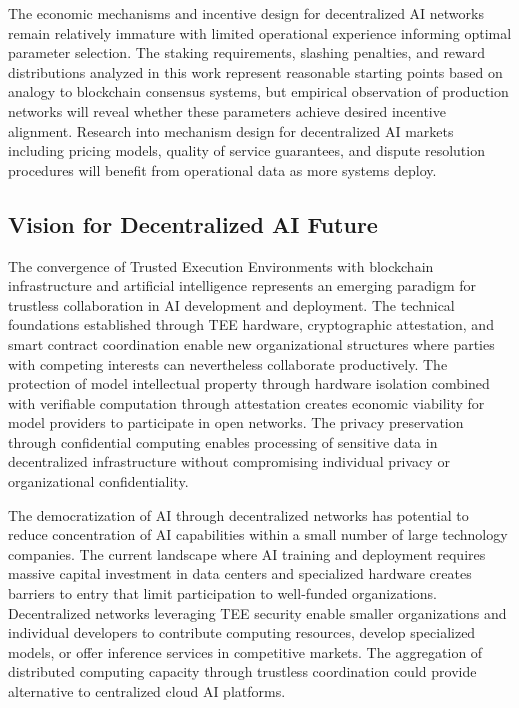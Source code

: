 The economic mechanisms and incentive design for decentralized AI networks remain relatively immature with limited operational experience informing optimal parameter selection. The staking requirements, slashing penalties, and reward distributions analyzed in this work represent reasonable starting points based on analogy to blockchain consensus systems, but empirical observation of production networks will reveal whether these parameters achieve desired incentive alignment. Research into mechanism design for decentralized AI markets including pricing models, quality of service guarantees, and dispute resolution procedures will benefit from operational data as more systems deploy.

\subsection{Vision for Decentralized AI Future}

The convergence of Trusted Execution Environments with blockchain infrastructure and artificial intelligence represents an emerging paradigm for trustless collaboration in AI development and deployment. The technical foundations established through TEE hardware, cryptographic attestation, and smart contract coordination enable new organizational structures where parties with competing interests can nevertheless collaborate productively. The protection of model intellectual property through hardware isolation combined with verifiable computation through attestation creates economic viability for model providers to participate in open networks. The privacy preservation through confidential computing enables processing of sensitive data in decentralized infrastructure without compromising individual privacy or organizational confidentiality.

The democratization of AI through decentralized networks has potential to reduce concentration of AI capabilities within a small number of large technology companies. The current landscape where AI training and deployment requires massive capital investment in data centers and specialized hardware creates barriers to entry that limit participation to well-funded organizations. Decentralized networks leveraging TEE security enable smaller organizations and individual developers to contribute computing resources, develop specialized models, or offer inference services in competitive markets. The aggregation of distributed computing capacity through trustless coordination could provide alternative to centralized cloud AI platforms.

